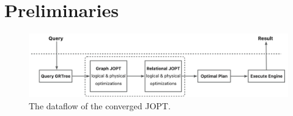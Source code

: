 \documentclass[sigconf, nonacm]{acmart}
\begin{document}
\section{Preliminaries}
\label{sec:preliminaries}



\begin{figure}
    \includegraphics[width=.8\textwidth]{figures/dataflow.png}
    \caption{The dataflow of the converged JOPT.}
    \label{fig:dataflow}
\end{figure}
\end{document}
